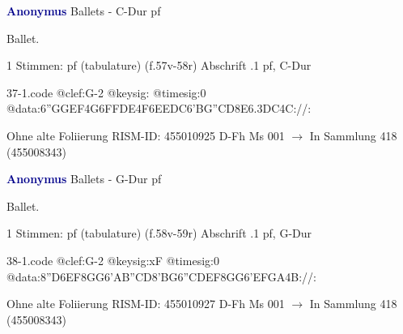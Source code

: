\documentclass[twocolumn]{book}
\begin{document}
\newline \par \vspace{7pt} \textcolor{darkblue}{\textbf{Anonymus  }}
\newline Ballets - C-Dur
\newline pf
\newline \begin{itshape}[f.57v, at left:] Ballet.\end{itshape} 
\newline \textcolor{darkblue}{}  1 Stimmen: pf (tabulature)  (f.57v-58r)
\newline Abschrift
.1  pf, C-Dur  
\begin{filecontents*}{37-1.code}
@clef:G-2
@keysig:
@timesig:0
@data:{6''GGEF}4G{6FFDE}4F{6EEDC}{6'BG''CD}{8E6.3DC}4C://:
\end{filecontents*}
\newline
%
\newline Ohne alte Foliierung
\newline RISM-ID: 455010925
\newline D-Fh  Ms 001
\newline $\rightarrow$ In Sammlung 418 (455008343)
      
\newline \par \vspace{7pt} \textcolor{darkblue}{\textbf{Anonymus  }}
\newline Ballets - G-Dur
\newline pf
\newline \begin{itshape}[f.58v, at left:] Ballet.\end{itshape} 
\newline \textcolor{darkblue}{}  1 Stimmen: pf (tabulature)  (f.58v-59r)
\newline Abschrift
.1  pf, G-Dur  
\begin{filecontents*}{38-1.code}
@clef:G-2
@keysig:xF
@timesig:0
@data:{8''D6EF8GG}{6'AB''CD}{8'BG}{6''CDEF}{8GG}{6'EFGA}4B://:
\end{filecontents*}
\newline
%
\newline Ohne alte Foliierung
\newline RISM-ID: 455010927
\newline D-Fh  Ms 001
\newline $\rightarrow$ In Sammlung 418 (455008343)
      
\end{document}
